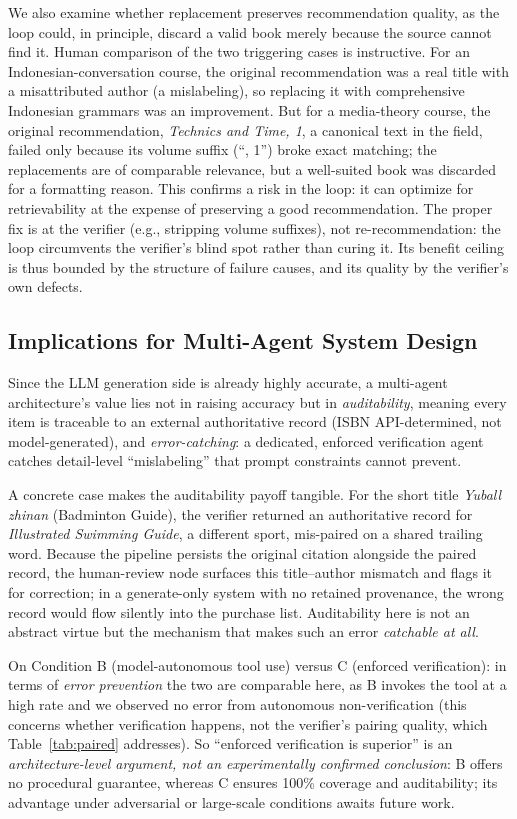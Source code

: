 \documentclass[conference]{IEEEtran}
\begin{document}
We also examine whether replacement preserves recommendation quality, as the loop
could, in principle, discard a valid book merely because the source cannot find
it. Human comparison of the two triggering cases is instructive. For an
Indonesian-conversation course, the original recommendation was a real title with
a misattributed author (a mislabeling), so replacing it with comprehensive
Indonesian grammars was an improvement. But for a media-theory course, the
original recommendation, \textit{Technics and Time, 1}, a canonical text in the
field, failed only because its volume suffix (``, 1'') broke exact matching; the
replacements are of comparable relevance, but a well-suited book was discarded for
a formatting reason. This confirms a risk in the loop: it can optimize for
retrievability at the expense of preserving a good recommendation. The proper fix
is at the verifier (e.g., stripping volume suffixes), not re-recommendation: the
loop circumvents the verifier's blind spot rather than curing it. Its benefit
ceiling is thus bounded by the structure of failure causes, and its quality by the
verifier's own defects.

\subsection{Implications for Multi-Agent System Design}
Since the LLM generation side is already highly accurate, a multi-agent
architecture's value lies not in raising accuracy but in
\textit{auditability}, meaning every item is traceable to an external
authoritative record (ISBN API-determined, not model-generated), and
\textit{error-catching}: a dedicated, enforced verification agent catches
detail-level ``mislabeling'' that prompt constraints cannot prevent.

A concrete case makes the auditability payoff tangible. For the short title
\textit{Yuball zhinan} (Badminton Guide), the verifier returned an authoritative
record for \textit{Illustrated Swimming Guide}, a different sport, mis-paired on
a shared trailing word. Because the pipeline persists the original citation
alongside the paired record, the human-review node surfaces this title--author
mismatch and flags it for correction; in a generate-only system with no retained
provenance, the wrong record would flow silently into the purchase list.
Auditability here is not an abstract virtue but the mechanism that makes such an
error \emph{catchable at all}.

On Condition B (model-autonomous tool use) versus C (enforced verification): in
terms of \emph{error prevention} the two are comparable here, as B invokes the
tool at a high rate and we observed no error from autonomous non-verification
(this concerns whether verification happens, not the verifier's pairing quality,
which Table~\ref{tab:paired} addresses). So ``enforced verification is superior''
is an \textit{architecture-level argument, not an experimentally confirmed
conclusion}: B offers no procedural guarantee, whereas C ensures 100\% coverage
and auditability; its advantage under adversarial or large-scale conditions
awaits future work.
\end{document}
